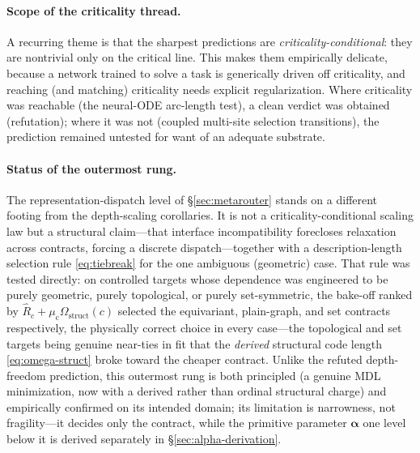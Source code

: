 \documentclass[11pt]{article}
\theoremstyle{definition}
\newcommand{\alphapar}{\bm{\alpha}}
\begin{document}
\paragraph{Scope of the criticality thread.} A recurring theme is that the sharpest
predictions are \emph{criticality-conditional}: they are nontrivial only on the critical line.
This makes them empirically delicate, because a network trained to solve a task is generically
driven off criticality, and reaching (and matching) criticality needs explicit
regularization. Where criticality was reachable (the neural-ODE arc-length test), a clean
verdict was obtained (refutation); where it was not (coupled multi-site selection transitions),
the prediction remained untested for want of an adequate substrate.

\paragraph{Status of the outermost rung.} The representation-dispatch level of
\S\ref{sec:metarouter} stands on a different footing from the depth-scaling corollaries. It is
not a criticality-conditional scaling law but a structural claim---that interface
incompatibility forecloses relaxation across contracts, forcing a discrete dispatch---together
with a description-length selection rule \eqref{eq:tiebreak} for the one ambiguous (geometric)
case. That rule was tested directly: on controlled targets whose dependence was engineered to be
purely geometric, purely topological, or purely set-symmetric, the bake-off ranked by
$\widehat{R}_c+\mu_{\mathrm c}\Omega_{\mathrm{struct}}(c)$ selected the equivariant, plain-graph, and set
contracts respectively, the physically correct choice in every case---the topological and set targets
being genuine near-ties in fit that the \emph{derived} structural code length \eqref{eq:omega-struct}
broke toward the cheaper contract. Unlike the refuted depth-freedom prediction, this
outermost rung is both principled (a genuine MDL minimization, now with a derived rather than ordinal
structural charge) and empirically confirmed on its
intended domain; its limitation is narrowness, not fragility---it decides only the contract, while
the primitive parameter $\alphapar$ one level below it is derived separately in
\S\ref{sec:alpha-derivation}.
\end{document}
